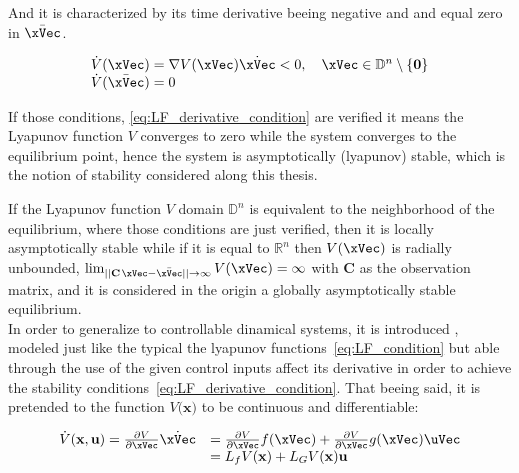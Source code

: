 And it is characterized by its time derivative beeing negative and and equal zero in \(\bar{\xVec}\).  

\begin{equation}
    \begin{array}{l}
        \dot{V}(\xVec) = \nabla V(\xVec)\dot{\xVec} < 0, \quad \xVec \in \mathbb{D}^n\setminus \{\mathbf{0}\} \\
        \dot{V}(\bar{\xVec}) = 0
    \end{array}
    \label{eq:LF_derivative_condition}
\end{equation}

If those conditions, \ref{eq:LF_derivative_condition} are verified it means the Lyapunov function \(V\) converges to zero while the system converges to the equilibrium point, hence the system is asymptotically (lyapunov) stable, which is the notion of stability considered along this thesis.\par
If the Lyapunov function \(V\) domain \(\mathbb{D}^n\) is equivalent to the neighborhood of the equilibrium, where those conditions are just verified, then it is locally asymptotically stable while if it is equal to \(\mathbb{R}^n\) then \(V(\xVec)\) is radially unbounded, \(\lim_{||\mathbf{C}\hspace{0.1em}\xVec - \bar{\xVec}||\to \infty}V(\xVec) = \infty\) with \(\mathbf{C}\) as the observation matrix, and it is considered in the origin a globally asymptotically stable equilibrium. \\

In order to generalize to controllable dinamical systems, it is introduced , modeled just like the typical the lyapunov functions~\ref{eq:LF_condition} but able through the use of the given control inputs affect its derivative in order to achieve the stability conditions~\ref{eq:LF_derivative_condition}. That beeing said, it is pretended to the  function \( V\mathbf(\mathbf{x}) \) to be continuous and differentiable:

\begin{equation}
\begin{array}{ll}
    \dot{V} (\mathbf{x}, \mathbf{u}) = \frac{\partial V}{\partial \xVec}\dot{\xVec} &= \frac{\partial V}{\partial \xVec}f(\xVec) + \frac{\partial V}{\partial \xVec}g(\xVec)\uVec \\
                                     &=  L_fV(\mathbf{x}) + L_GV(\mathbf{x})\mathbf{u}
\end{array}
\label{eq:CLF_derivative}
\end{equation}



